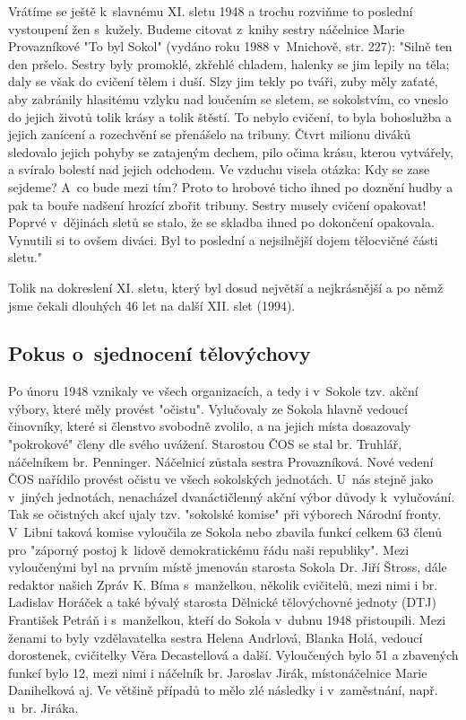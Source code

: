 \documentclass[a5paper, 11pt, twoside]{article}
\begin{document}
Vrátíme se ještě k~slavnému XI. sletu 1948 a trochu rozviňme to poslední
vystoupení žen s~kužely. Budeme citovat z~knihy sestry náčelnice Marie
Provazníkové "To byl Sokol" (vydáno roku 1988 v~Mnichově, str. 227):
"Silně ten den pršelo. Sestry byly promoklé, zkřehlé chladem, halenky se
jim lepily na těla; daly se však do cvičení tělem i duší. Slzy jim tekly
po tváři, zuby měly zaťaté, aby zabránily hlasitému vzlyku nad loučením
se sletem, se sokolstvím, co vneslo do jejich životů tolik krásy a tolik
štěstí. To nebylo cvičení, to byla bohoslužba a jejich zanícení a
rozechvění se přenášelo na tribuny. Čtvrt milionu diváků sledovalo
jejich pohyby se zatajeným dechem, pilo očima krásu, kterou vytvářely, a
svíralo bolestí nad jejich odchodem. Ve vzduchu visela otázka: Kdy se
zase sejdeme? A~co bude mezi tím? Proto to hrobové ticho ihned po
doznění hudby a pak ta bouře nadšení hrozící zbořit tribuny. Sestry
musely cvičení opakovat! Poprvé v~dějinách sletů se stalo, že se skladba
ihned po dokončení opakovala. Vynutili si to ovšem diváci. Byl to
poslední a nejsilnější dojem tělocvičné části sletu."

Tolik na dokreslení XI. sletu, který byl dosud největší a nejkrásnější a
po němž jsme čekali dlouhých 46 let na další XII. slet (1994).

\subsection{Pokus o~sjednocení tělovýchovy}

Po únoru 1948 vznikaly ve všech organizacích, a tedy i v~Sokole tzv.
akční výbory, které měly provést "očistu". Vylučovaly ze Sokola hlavně
vedoucí činovníky, které si členstvo svobodně zvolilo, a na jejich místa
dosazovaly "pokrokové" členy dle svého uvážení. Starostou ČOS se stal
br. Truhlář, náčelníkem br. Penninger. Náčelnicí zůstala sestra
Provazníková. Nové vedení ČOS nařídilo provést očistu ve všech
sokolských jednotách. U~nás stejně jako v~jiných jednotách, nenacházel
dvanáctičlenný akční výbor důvody k~vylučování. Tak se očistných akcí
ujaly tzv. "sokolské komise" při výborech Národní fronty. V~Libni
taková komise vyloučila ze Sokola nebo zbavila funkcí celkem 63 členů
pro "záporný postoj k~lidově demokratickému řádu naši republiky". Mezi
vyloučenými byl na prvním místě jmenován starosta Sokola Dr. Jiří
Štross, dále redaktor našich Zpráv K. Bíma s~manželkou, několik
cvičitelů, mezi nimi i br. Ladislav Horáček a také bývalý starosta
Dělnické tělovýchovné jednoty (DTJ) František Petráň i s~manželkou,
kteří do Sokola v~dubnu 1948 přistoupili. Mezi ženami to byly
vzdělavatelka sestra Helena Andrlová, Blanka Holá, vedoucí dorostenek,
cvičitelky Věra Decastellová a další. Vyloučených bylo 51 a zbavených
funkcí bylo 12, mezi nimi i náčelník br. Jaroslav Jirák, místonáčelnice
Marie Danihelková aj. Ve většině případů to mělo zlé následky i
v~zaměstnání, např. u~br. Jiráka.
\end{document}
